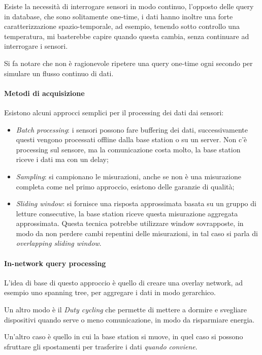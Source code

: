 Esiste la necessità di interrogare sensori in modo continuo, l'opposto 
delle query in database, che sono solitamente one-time, 
i dati hanno inoltre una forte caratterizzazione spazio-temporale, ad esempio, 
tenendo sotto controllo una temperatura, mi basterebbe capire quando 
questa cambia, senza continuare ad interrogare i sensori.

Si fa notare che non è ragionevole ripetere una query one-time ogni secondo 
per simulare un flusso continuo di dati.

\paragraph{Metodi di acquisizione}
Esistono alcuni approcci semplici per il processing dei dati dai sensori:
\begin{itemize}
    \item \emph{Batch processing}: i sensori possono fare buffering dei dati, 
    successivamente questi 
    vengono processati offline dalla base station
    o su un server.
    Non c'è processing sul sensore, ma la comunicazione 
    costa molto, la base station riceve i dati ma con un delay;
    \item \emph{Sampling}: si campionano le misurazioni, anche se non 
    è una misurazione completa come nel primo approccio, esistono delle garanzie 
    di qualità;
    \item \emph{Sliding window}: si fornisce una risposta approssimata 
    basata su un gruppo di letture consecutive, la base station 
    riceve questa misurazione aggregata approssimata. Questa tecnica potrebbe utilizzare 
    window sovrapposte, in modo da non perdere cambi repentini delle misurazioni, in tal 
    caso si parla di \emph{overlapping sliding window}.
\end{itemize}

\paragraph{In-network query processing}
L'idea di base di questo approccio è quello 
di creare una overlay network, ad esempio uno spanning tree, 
per aggregare i dati in modo gerarchico.

Un altro modo è il \emph{Duty cycling} che permette 
di mettere a dormire e svegliare dispositivi quando serve 
o meno comunicazione, in modo da risparmiare energia.

Un'altro caso è quello in cui la base station si muove, 
in quel caso si possono sfruttare gli spostamenti per 
trasferire i dati \emph{quando conviene}.

